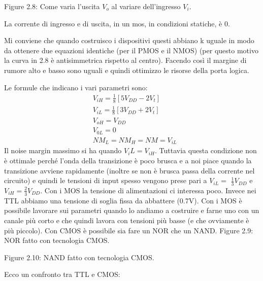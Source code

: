 \documentclass[
]{article}
\begin{document}
Figure 2.8: Come varia l'uscita \(V_{o}\) al variare dell'ingresso
\(V_{i}\).

La corrente di ingresso e di uscita, in un mos, in condizioni statiche,
è 0.

Mi conviene che quando costruisco i dispositivi questi abbiano k uguale
in modo da ottenere due equazioni identiche (per il PMOS e il NMOS) (per
questo motivo la curva in 2.8 è antisimmetrica rispetto al centro).
Facendo così il margine di rumore alto e basso sono uguali e quindi
ottimizzo le risorse della porta logica.

Le formule che indicano i vari parametri sono:
\[\begin{aligned}&V_{iH}=\frac{1}{8}[5V_{DD}-2V_{t}]\\&V_{iL}=\frac{1}{8}[3V_{DD}+2V_{t}]\\&V_{oH}=V_{DD}\\&V_{0L}=0\\&NM_{L}=NM_{H}=NM=V_{iL}\end{aligned}\]
Il noise margin massimo si ha quando \(V_iL=V_{iH}\). Tuttavia questa
condizione non è ottimale perché l'onda della transizione è poco brusca
e a noi piace quando la transizione avviene rapidamente (inoltre se non
è brusca passa della corrente nel circuito) e quindi le tensioni di
input spesso vengono prese pari a \(V_{iL}=\) \(\frac{1}{3}V_{DD}\)
e\(V_{iH}=\frac{2}{3}V_{DD}.\) Con i MOS la tensione di alimentazioni ci
interessa poco. Invece nei TTL abbiamo una tensione di soglia fissa da
abbattere (0.7V). Con i MOS è possibile lavorare sui parametri quando lo
andiamo a costruire e farne uno con un canale più corto e che quindi
lavora con tensioni più basse (e che ovviamente è più piccolo). Con CMOS
è possibile sia fare un NOR che un NAND. Figure 2.9: NOR fatto con
tecnologia CMOS.

Figure 2.10: NAND fatto con tecnologia CMOS.

Ecco un confronto tra TTL e CMOS:
\end{document}
